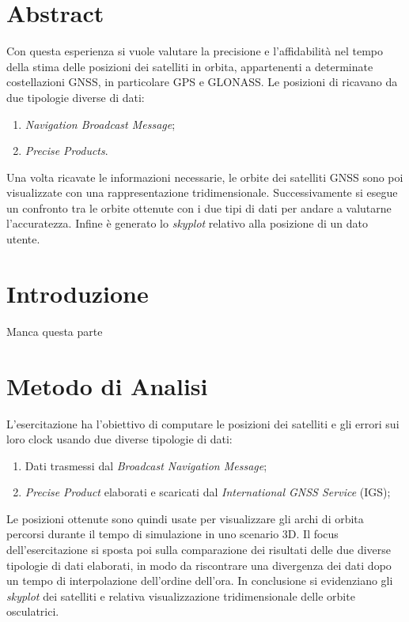 \documentclass[a4paper,11pt,twoside]{book}
\begin{document}
	\section{Abstract}
	
	Con questa esperienza si vuole valutare la precisione e l'affidabilità nel tempo della stima delle posizioni dei satelliti in orbita, appartenenti a determinate costellazioni GNSS, in particolare GPS e GLONASS. Le posizioni di ricavano da due tipologie diverse di dati:
	
	\begin{enumerate}
		\item \textit{Navigation Broadcast Message};
		
		\item \textit{Precise Products}.
	\end{enumerate}
	
	Una volta ricavate le informazioni necessarie, le orbite dei satelliti GNSS sono poi visualizzate
	con una rappresentazione tridimensionale. Successivamente si esegue un confronto tra le orbite ottenute con i due tipi di dati per andare a valutarne l’accuratezza.
	Infine è generato lo \textit{skyplot} relativo alla posizione di un dato utente.
	
	\section{Introduzione}
	
	Manca questa parte
	
	\section{Metodo di Analisi}
	
	L'esercitazione ha l'obiettivo di computare le posizioni dei satelliti e gli errori sui loro clock usando due diverse tipologie di dati:
	
	\begin{enumerate}
		\item Dati trasmessi dal \textit{Broadcast Navigation Message};
		
		\item \textit{Precise Product} elaborati e scaricati dal \textit{International GNSS Service} (IGS);
	\end{enumerate}

	Le posizioni ottenute sono quindi usate per visualizzare gli archi di orbita percorsi durante il tempo di simulazione in uno scenario 3D.
	Il focus dell'esercitazione si sposta poi sulla comparazione dei risultati delle due diverse tipologie di dati elaborati, in modo da riscontrare una divergenza dei dati dopo un tempo di interpolazione dell'ordine dell'ora.
	In conclusione si evidenziano gli \textit{skyplot} dei satelliti e relativa visualizzazione tridimensionale delle orbite osculatrici.
	
\end{document}
